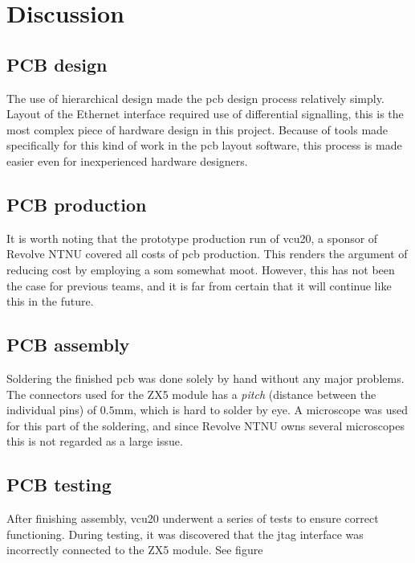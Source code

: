 \section{Discussion}

\subsection{PCB design}

The use of hierarchical design made the \acrshort{pcb} design process relatively simply. Layout of the Ethernet interface required use of differential signalling, this is the most complex piece of hardware design in this project. Because of tools made specifically for this kind of work in the \acrshort{pcb} layout software, this process is made easier even for inexperienced hardware designers.  

\subsection{PCB production}

It is worth noting that the prototype production run of \acrshort{vcu20}, a sponsor of Revolve NTNU covered all costs of \acrshort{pcb} production. This renders the argument of reducing cost by employing a \acrshort{som} somewhat moot. However, this has not been the case for previous teams, and it is far from certain that it will continue like this in the future.

\subsection{PCB assembly}

Soldering the finished \acrshort{pcb} was done solely by hand without any major problems. The connectors used for the ZX5 module has a \emph{pitch} (distance between the individual pins) of $0.5\si{\milli\metre}$, which is hard to solder by eye. A microscope was used for this part of the soldering, and since Revolve NTNU owns several microscopes this is not regarded as a large issue.   

\subsection{PCB testing}

After finishing assembly, \acrshort{vcu20} underwent a series of tests to ensure correct functioning. During testing, it was discovered that the \acrfull{jtag} interface was incorrectly connected to the ZX5 module. See figure 


